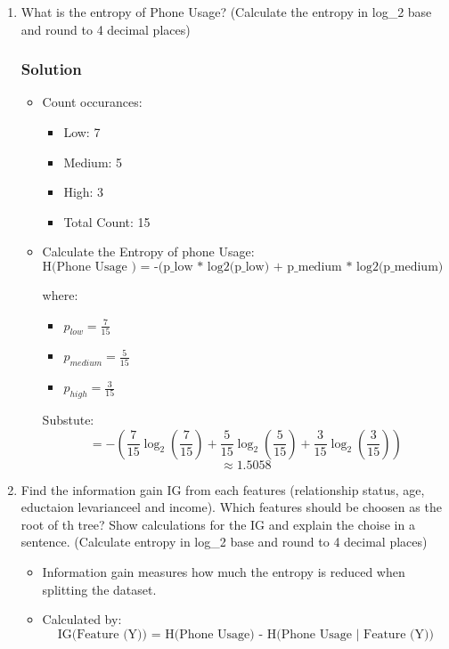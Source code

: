 \documentclass{article}
\begin{document}
\begin{enumerate}[label=\alph*)]
   \item What is the entropy of Phone Usage? (Calculate the entropy in log\_2 base and round to 4 decimal places)
   \subsubsection*{Solution}
   \begin{itemize}
      \item Count occurances:
      \begin{itemize}
         \item Low: 7
         \item Medium: 5
         \item High: 3
         \item Total Count: 15
      \end{itemize}

      \item Calculate the Entropy of phone Usage:
      \[
      \text{H(Phone Usage ) = -(p\_low * log2(p\_low) + p\_medium * log2(p\_medium) + p\_high * log2(p\_high))}
      \]

      where:
      \begin{itemize}
         \item $p_{low} = \frac{7}{15}$
         \item $p_{medium} = \frac{5}{15}$
         \item $p_{high} = \frac{3}{15}$
      \end{itemize}

      Substute:
      \[
      = -(\frac{7}{15} \log_2(\frac{7}{15}) + \frac{5}{15} \log_2(\frac{5}{15}) + \frac{3}{15} \log_2(\frac{3}{15}))
      \]
      \[
      \approx 1.5058
      \]
   
   \end{itemize}

   \item Find the information gain {IG} from each features (relationship status, age, eductaion levarianceel and income). Which features
   should be choosen as the root of th tree? Show calculations for the IG and explain the choise in a sentence. (Calculate entropy in log\_2 base and round to 4 decimal places) 
   \begin{itemize}
      \item Information gain measures how much the entropy is reduced when splitting the dataset.
      \item Calculated by:
      \[
      \text{IG(Feature (Y)) = H(Phone Usage) - H(Phone Usage | Feature (Y))}
      \]
   \end{itemize}

\end{enumerate}
\end{document}
